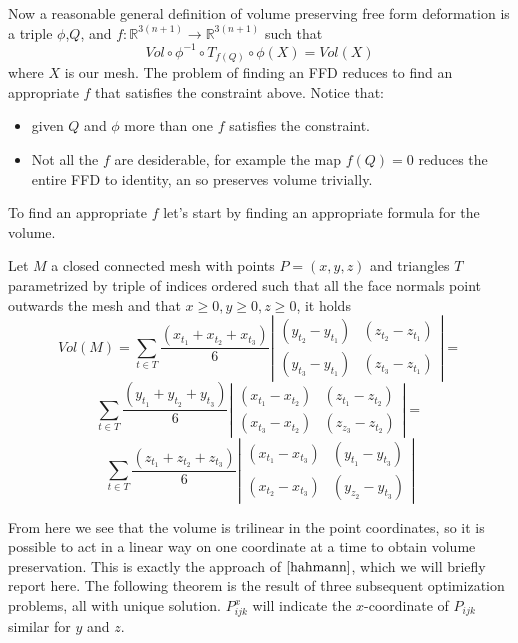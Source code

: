 \documentclass{article}
\begin{document}
Now a reasonable general definition of volume preserving free form deformation is a triple $\phi$,$Q$, and $f: \mathbb{R}^{3(n+1)} \rightarrow \mathbb{R}^{3(n+1)}$ such that $$Vol \circ \phi^{-1}\circ T_{f(Q)} \circ \phi (X)=Vol(X)$$ where $X$ is our mesh. The problem of finding an FFD reduces to find an appropriate $f$ that satisfies the constraint above. 
Notice that:
\begin{itemize}
\item given $Q$ and $\phi$ more than one $f$ satisfies the constraint.
\item Not all the $f$ are desiderable, for example the map $f(Q)=0$ reduces the entire FFD to identity, an so preserves volume trivially. 
\end{itemize}
To find an appropriate $f$ let's start by finding an appropriate formula for the volume.
\begin{Theorem}\label{thm:vol}
Let $M$ a closed connected mesh with points $P=(x,y,z)$ and triangles $T$ parametrized by triple of indices ordered such that all the face normals point outwards the mesh and that $x\ge 0,y\ge 0,z\ge 0$, it holds
$$Vol(M)=\sum_{t\in T} \frac{(x_{t_{1}}+x_{t_{2}}+x_{t_{3}})}{6}\left|\begin{array}{cl}
\left(y_{t_{2}}-y_{t_{1}}\right) & \left(z_{t_{2}}-z_{t_{1}}\right) \\
\left(y_{t_{3}}-y_{t_{1}}\right) & \left(z_{t_{3}}-z_{t_{1}}\right)
\end{array}\right|= $$ 
$$\sum_{t\in T} \frac{(y_{t_{1}}+y_{t_{2}}+y_{t_{3}})}{6}\left|\begin{array}{cl}
\left(x_{t_{1}}-x_{t_{2}}\right) & \left(z_{t_{1}}-z_{t_{2}}\right) \\
\left(x_{t_{3}}-x_{t_{2}}\right) & \left(z_{z_{3}}-z_{t_{2}}\right)
\end{array}\right|=$$
$$\sum_{t\in T} \frac{(z_{t_{1}}+z_{t_{2}}+z_{t_{3}})}{6}\left|\begin{array}{cl}
\left(x_{t_{1}}-x_{t_{3}}\right) & \left(y_{t_{1}}-y_{t_{3}}\right) \\
\left(x_{t_{2}}-x_{t_{3}}\right) & \left(y_{z_{2}}-y_{t_{3}}\right)
\end{array}\right|$$
\end{Theorem}
From here we see that the volume is trilinear in the point coordinates, so it is possible to act in a linear way on one coordinate at a time to obtain volume preservation. This is exactly the approach of $\cite{hahmann}$, which we will briefly report here. The following theorem is the result of three subsequent optimization problems, all with unique solution. $P_{ijk}^{x}$ will indicate the $x$-coordinate of $P_{ijk}$ similar for $y$ and $z$. 
\end{document}
